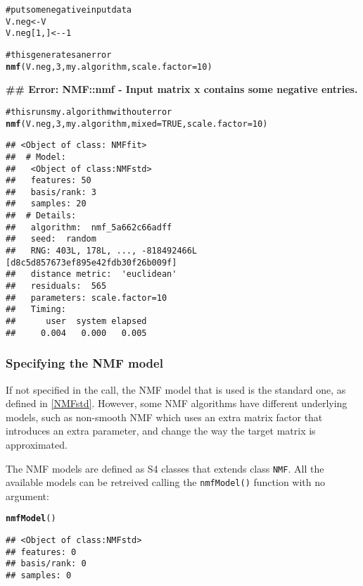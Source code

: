 \documentclass[a4paper]{article}\usepackage{graphicx, color}
\makeatletter
\newcommand{\hlfunctioncall}[1]{\textcolor[rgb]{0.501960784313725,0,0.329411764705882}{\textbf{#1}}}%
\newcommand{\hlcomment}[1]{\textcolor[rgb]{0.180392156862745,0.6,0.341176470588235}{#1}}%
\newenvironment{kframe}{%
 \def\at@end@of@kframe{}%
 \ifinner\ifhmode%
  \def\at@end@of@kframe{\end{minipage}}%
  \begin{minipage}{\columnwidth}%
 \fi\fi%
 \def\FrameCommand##1{\hskip\@totalleftmargin \hskip-\fboxsep
 \colorbox{shadecolor}{##1}\hskip-\fboxsep
     \hskip-\linewidth \hskip-\@totalleftmargin \hskip\columnwidth}%
 \MakeFramed {\advance\hsize-\width
   \@totalleftmargin\z@ \linewidth\hsize
   \@setminipage}}%
 {\par\unskip\endMakeFramed%
 \at@end@of@kframe}
\newenvironment{knitrout}{}{} %
\let\code=\texttt
\renewcommand{\cite}[1]{\parencite{#1}}
\makeatother
\begin{document}
\begin{knitrout}
\color{fgcolor}\begin{kframe}
\begin{alltt}
\hlcomment{# put some negative input data}
V.neg <- V
V.neg[1, ] <- -1

\hlcomment{# this generates an error}
\hlfunctioncall{nmf}(V.neg, 3, my.algorithm, scale.factor = 10)
\end{alltt}


{\ttfamily\noindent\bfseries\textcolor{errorcolor}{\#\# Error: NMF::nmf - Input matrix x contains some negative entries.}}\begin{alltt}

\hlcomment{# this runs my.algorithm without error}
\hlfunctioncall{nmf}(V.neg, 3, my.algorithm, mixed = TRUE, scale.factor = 10)
\end{alltt}
\begin{verbatim}
## <Object of class: NMFfit>
##  # Model:
##   <Object of class:NMFstd>
##   features: 50 
##   basis/rank: 3 
##   samples: 20 
##  # Details:
##   algorithm:  nmf_5a662c66adff 
##   seed:  random 
##   RNG: 403L, 178L, ..., -818492466L [d8c5d857673ef895e42fdb30f26b009f]
##   distance metric:  'euclidean' 
##   residuals:  565 
##   parameters: scale.factor=10 
##   Timing:
##      user  system elapsed 
##     0.004   0.000   0.005
\end{verbatim}
\end{kframe}
\end{knitrout}


\subsubsection{Specifying the NMF model}
If not specified in the call, the NMF model that is used is the standard one, as defined in \cref{NMFstd}. 
However, some NMF algorithms have different underlying models, such as non-smooth NMF \cite{Pascual-Montano2006} which uses an extra matrix factor that introduces an extra parameter, and change the way the target matrix is approximated.

The NMF models are defined as S4 classes that extends class \code{NMF}. All the available models can be retreived calling the \code{nmfModel()} function with no 
argument:

\begin{knitrout}
\color{fgcolor}\begin{kframe}
\begin{alltt}
\hlfunctioncall{nmfModel}()
\end{alltt}
\begin{verbatim}
## <Object of class:NMFstd>
## features: 0 
## basis/rank: 0 
## samples: 0
\end{verbatim}
\end{kframe}
\end{knitrout}
\end{document}
